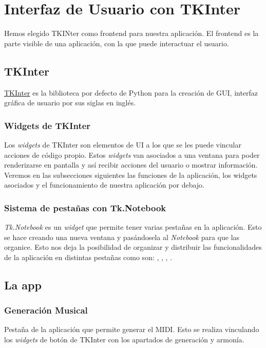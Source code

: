 \chapter{Interfaz de Usuario con TKInter}
\label{cap:GUIconTKInter}
Hemos elegido TKINter como frontend para nuestra aplicación. El frontend es la parte visible de una aplicación, con la que puede interactuar el usuario.

\section{TKInter}
\label{sec:TK}
\href{https://docs.python.org/es/3/library/tkinter.html}{TKInter} es la biblioteca por defecto de Python para la creación de GUI, interfaz gráfica de usuario por sus siglas en inglés.


\subsection{Widgets de TKInter}
Los \textit{widgets} de TKInter son elementos de UI a los que se les puede vincular acciones de código propio. Estos \textit{widgets} van asociados a una ventana para poder renderizarse en pantalla y así recibir acciones del usuario o mostrar información. Veremos en las subsecciones siguientes las funciones de la aplicación, los widgets asociados y el funcionamiento de nuestra aplicación por debajo.

\subsection{Sistema de pestañas con Tk.Notebook}
\textit{Tk.Notebook} es un \textit{widget} que permite tener varias pestañas en la aplicación. Esto se hace creando una nueva ventana y pasándosela al \textit{Notebook} para que las organice. Esto nos deja la posibilidad de organizar y distribuir las funcionalidades de la aplicación en distintas pestañas como son: \generationTabName{}, \tematicTabName{}, \advancedTabName{}, \configTabName{}.

\section{La app}
\label{sec:TK:app}

\subsection{Generación Musical}
Pestaña de la aplicación que permite generar el MIDI. Esto se realiza vinculando los \textit{widgets} de botón de TKInter con los apartados de generación y armonía.

